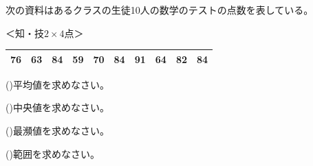 \documentclass[
  12pt,a4paper,lualatex,ja=standard]{bxjsarticle}
\begin{document}
\begin{flushleft}
\begin{multicols}{3}
\begin{center}
\end{center}

\end{multicols}

\vfill

\newpage

\setcounter{skaunta}{0}

\noindent{} \hspace{1pt}次の資料はあるクラスの生徒10人の数学のテストの点数を表している。

%
\begin{flushright}%
\footnotesize{＜知・技$2 \times 4$点＞}%
\end{flushright}%


\begin{center}
\begin{tabular}{|cccccccccc|}
\hline
76 & 63 & 84 & 59 & 70 & 84 & 91 & 64 & 82 & 84 \\
\hline
\end{tabular}
\end{center}

\begin{multicols}{2}

()\hspace{2.5pt}平均値を求めなさい。

\columnbreak

()\hspace{2.5pt}中央値を求めなさい。

\end{multicols}

\vspace{3mm}

\begin{multicols}{2}

()\hspace{2.5pt}最瀕値を求めなさい。

\columnbreak

()\hspace{2.5pt}範囲を求めなさい。

\end{multicols}

\vspace{3mm}

\begin{multicols}{2}


\end{multicols}
\end{flushleft}
\end{document}

